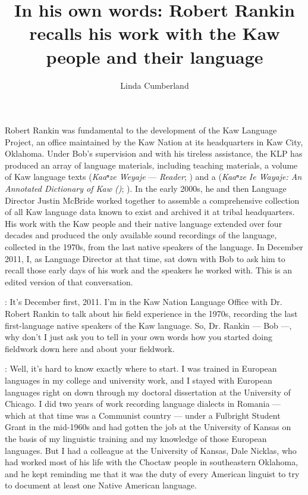 \documentclass[output=paper]{LSP/langsci}
\author{Linda Cumberland}
\title{In his own words: {Robert Rankin} recalls his work with the {Kaw} people and their language}
\begin{document}
Robert Rankin was fundamental to the development of the Kaw Language Project, an office maintained by the Kaw Nation at its headquarters in Kaw City, Oklahoma. Under Bob's supervision and with his tireless assistance, the KLP has produced an array of language materials, including teaching materials, a volume of Kaw language texts (\textit{Kaaⁿze Weyaje} --- \textit{ Reader}; \citealt{KanzaLP2010}) and a  (\textit{Kaaⁿze Ie Wayaje: An Annotated Dictionary of Kaw ()}; \citealt{CumberlandRankin2012}). In the early 2000s, he and then Language Director Justin McBride worked together to assemble a comprehensive collection of all Kaw language data known to exist and archived it at tribal headquarters. His work with the Kaw people and their native language extended over four decades and produced the only available sound recordings of the language, collected in the 1970s, from the last native speakers of the language. In December 2011, I, as Language Director at that time, sat down with Bob to ask him to recall those early days of his work and the speakers he worked with. This is an edited version of that conversation.

: It's December first, 2011. I'm in the Kaw Nation Language Office with Dr. Robert Rankin to talk about his field experience in the 1970s, recording the last first-language native speakers of the Kaw language. So, Dr. Rankin --- Bob ---, why don't I just ask you to tell in your own words how you started doing fieldwork down here and about your fieldwork. 

:  Well, it's hard to know exactly where to start. I was trained in European languages in my college and university work, and I stayed with European languages right on down through my doctoral dissertation at the University of Chicago. I did two years of work recording  language dialects in Romania --- which at that time was a Communist country --- under a Fulbright Student Grant in the mid-1960s and had gotten the job at the University of Kansas on the basis of my linguistic training and my knowledge of those European languages. But I had a colleague at the University of Kansas, Dale Nicklas, who had worked most of his life with the Choctaw people in southeastern Oklahoma, and he kept reminding me that it was the duty of every American linguist to try to document at least one Native American language. 
\end{document}
